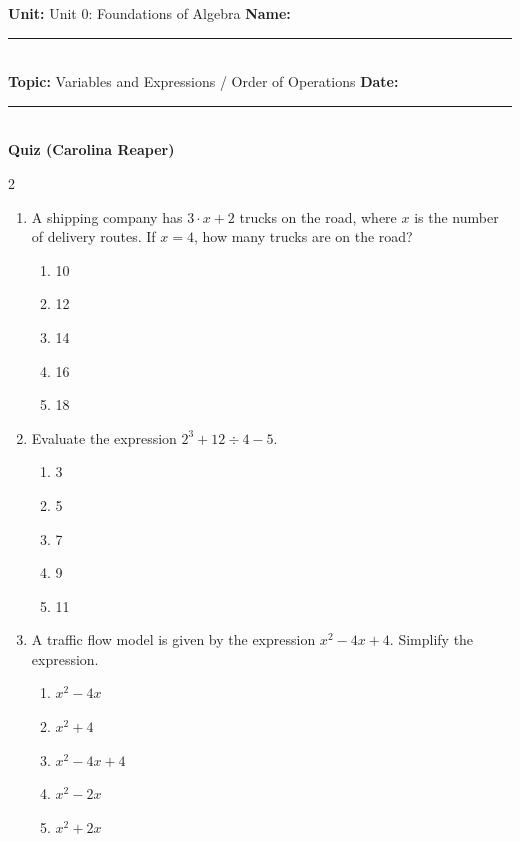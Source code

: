 \documentclass[10pt]{article}
\begin{document}
\enlargethispage{2.5cm}

\begin{tcolorbox}[colback=mainblue!5, colframe=mainblue, sharp corners, boxrule=0.5pt]
    \small \textbf{Unit:} Unit 0: Foundations of Algebra \hfill \textbf{Name:} \rule{3cm}{0.4pt} \\
    \small \textbf{Topic:} Variables and Expressions / Order of Operations \hfill \textbf{Date:} \rule{2cm}{0.4pt} \\
    \centering \textbf{\large Quiz (Carolina Reaper)}
\end{tcolorbox}

\vspace{0.2cm}

\begin{multicols}{2}
\begin{enumerate}[label=\textbf{Q\arabic*.}, leftmargin=*, itemsep=6pt, parsep=0pt]

  \item \small A shipping company has $3 \cdot x + 2$ trucks on the road, where $x$ is the number of delivery routes. If $x = 4$, how many trucks are on the road?
  \begin{enumerate}[label=(\Alph*), leftmargin=0.6cm, nosep, itemsep=2pt]
    \item 10
    \item 12
    \item 14
    \item 16
    \item 18
  \end{enumerate}

  \item \small Evaluate the expression $2^3 + 12 \div 4 - 5$.
  \begin{enumerate}[label=(\Alph*), leftmargin=0.6cm, nosep, itemsep=2pt]
    \item 3
    \item 5
    \item 7
    \item 9
    \item 11
  \end{enumerate}

  \item \small A traffic flow model is given by the expression $x^2 - 4x + 4$. Simplify the expression.
  \begin{enumerate}[label=(\Alph*), leftmargin=0.6cm, nosep, itemsep=2pt]
    \item $x^2 - 4x$
    \item $x^2 + 4$
    \item $x^2 - 4x + 4$
    \item $x^2 - 2x$
    \item $x^2 + 2x$
  \end{enumerate}


\end{enumerate}
\end{multicols}
\end{document}
